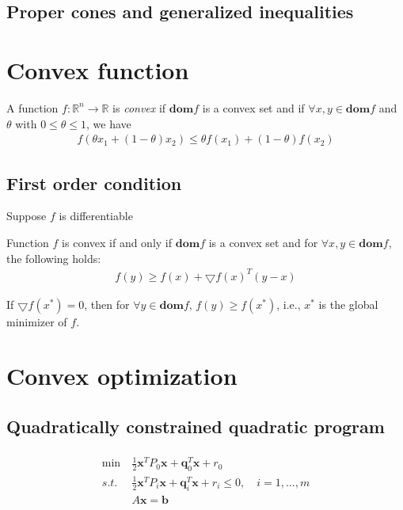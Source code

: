 \subsection{Proper cones and generalized inequalities}



\section{Convex function}
\begin{definition}
    A function $f:\mathbb{R}^n \rightarrow \mathbb{R}$
    is \emph{convex} if $\mathbf{dom}f$ is a convex
    set and if $\forall x, y \in \mathbf{dom}f$ and
    $\theta$ with $0 \leq \theta\leq 1$, we have
    \begin{align}
        f(\theta x_1 + (1 - \theta) x_2) \leq
        \theta f(x_1) + (1 - \theta) f(x_2)
    \end{align}
\end{definition}

\subsection{First order condition}
Suppose $f$ is differentiable
\begin{theorem}
    Function $f$ is convex if and only if $\mathbf{dom}f$
    is a convex set and for $\forall x, y \in \mathbf{dom}f$,
    the following holds:
    \begin{align}
        f(y) \geq f(x) + \bigtriangledown f(x)^T (y - x)
    \end{align}
\end{theorem}

\begin{remark}
    If $\bigtriangledown f(x^*) = 0$, then for
    $\forall y \in \mathbf{dom}f$, 
    $f(y) \geq f(x^*)$, i.e., $x^*$
    is the global minimizer of $f$.
\end{remark}


\section{Convex optimization}
\subsection{Quadratically constrained quadratic program}
\begin{align}
    \begin{array}{lll}
        \min \ &\frac{1}{2} \mathbf{x}^T P_0 \mathbf{x}
        + \mathbf{q}_0^T \mathbf{x} + r_0 \\
        s.t. \ &\frac{1}{2} \mathbf{x}^T P_i \mathbf{x}
        + \mathbf{q}_i^T \mathbf{x} + r_i \leq 0, \quad i = 1,...,m \\
        & A \mathbf{x} = \mathbf{b}
    \end{array}
\end{align}


